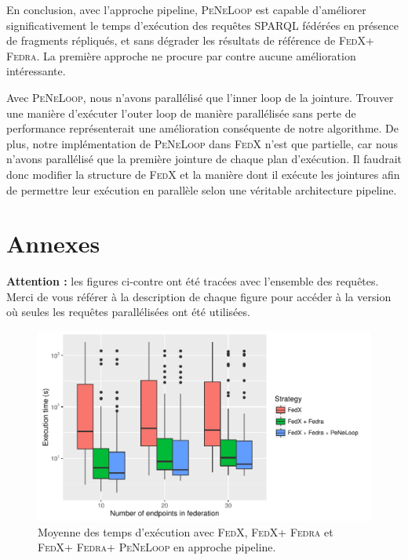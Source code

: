 \documentclass[a4paper]{article}
\def\sparql{\textsc{SPARQL}\xspace}
\def\fedra{\textsc{Fedra}\xspace}
\def\fedx{\textsc{FedX}\xspace}
\def\peneloop{\textsc{PeNeLoop}\xspace}
\begin{document}
En conclusion, avec l'approche pipeline, \peneloop est capable d'améliorer significativement le temps d'exécution des requêtes \sparql fédérées en présence de fragments répliqués, et sans dégrader les résultats de référence de \fedx + \fedra. La première approche ne procure par contre aucune amélioration intéressante.

Avec \peneloop, nous n'avons parallélisé que l'inner loop de la jointure. Trouver une manière d'exécuter l'outer loop de manière parallélisée sans perte de performance représenterait une amélioration conséquente de notre algorithme. De plus, notre implémentation de \peneloop dans \fedx n'est que partielle, car nous n'avons parallélisé que la première jointure de chaque plan d'exécution. Il faudrait donc modifier la structure de \fedx et la manière dont il exécute les jointures afin de permettre leur exécution en parallèle selon une véritable architecture pipeline.




\section{Annexes}

\textbf{Attention :} les figures ci-contre ont été tracées avec l'ensemble des requêtes. Merci de vous référer à la description de chaque figure pour accéder à la version où seules les requêtes parallélisées ont été utilisées.

\begin{figure}[h]
    \centering
    \includegraphics{boxplots/avg_execution_time.pdf}
    \caption{Moyenne des temps d'exécution avec \fedx, \fedx + \fedra et \fedx + \fedra + \peneloop en approche pipeline.}
    \label{fig:avg_time}
\end{figure}
\end{document}

